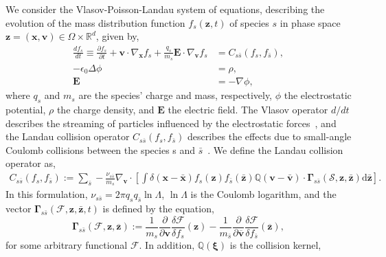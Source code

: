 \documentclass[preprint,12pt]{elsarticle}
\theoremstyle{definition}
\begin{document}
We consider the Vlasov-Poisson-Landau system of equations, describing the evolution of the mass distribution function $f_s (\boldsymbol{z},t)$ of species $s$ in phase space $\boldsymbol{z} = (\boldsymbol{x}, \boldsymbol{v}) \in \Omega \times \mathbb{R}^{d}$, given by,
\begin{align}
  \frac{d f_{s}}{d t} \equiv \frac{\partial f_{s}}{\partial t}+\boldsymbol{v} \cdot \nabla_{\boldsymbol{x}} f_{s}+\frac{q_s}{m_s} \boldsymbol{E} \cdot \nabla_{\boldsymbol{v}} f_{s} &= C_{s \bar{s}} (f_s, f_{\bar{s}}),\label{eq:VML}\\
  -\epsilon_0 \Delta \phi &= \rho,\label{eq:Poisson}\\
  \boldsymbol{E} &= -\nabla \phi\label{eq:electrostatic},
\end{align}
where $q_s$ and $m_s$ are the species' charge and mass, respectively, $\phi$ the electrostatic potential, $\rho$ the charge density, and $\boldsymbol{E}$ the electric field. The Vlasov operator $d/dt$  describes the streaming of particles influenced by the electrostatic forces~\cite{Vlasov1938}, and the Landau collision operator $C_{s \overline{s}}(f_s, f_{\bar{s}})$ describes the effects due to small-angle Coulomb collisions between the species s and $\bar{s}$~\cite{Landau1936}. We define the Landau collision operator as,
\begin{align}
C_{s \overline{s}}(f_s, f_{\bar{s}}):= \sum_{\bar{s}} -\frac{\nu_{s \bar{s}}}{m_s} \nabla_{\boldsymbol{v}} \cdot \left[ \int \delta (\boldsymbol{x} - \bar{\boldsymbol{x}}) f_s(\boldsymbol{z}) f_{\bar{s}}(\bar{\boldsymbol{z}}) \mathbb{Q}\left(\boldsymbol{v}-\bar{\boldsymbol{v}}\right) \cdot \boldsymbol{\Gamma}_{s \bar{s}} (\mathcal{S}, \boldsymbol{z},\bar{\boldsymbol{z}}) \mathrm{d} \boldsymbol{\bar{z}}\right].
\label{eq:ColOp}
\end{align}
In this formulation, $\nu_{s \bar{s}} = 2\pi q_s q_{\bar{s}} \ln \Lambda$, $\ln \Lambda$ is the Coulomb logarithm, and the vector $\boldsymbol{\Gamma}_{s \bar{s}} (\mathcal{F}, \boldsymbol{z},\bar{\boldsymbol{z}},t)$ is defined by the equation,
\begin{equation}
  \boldsymbol{\Gamma}_{s \bar{s}}(\mathcal{F}, \boldsymbol{z}, \overline{\boldsymbol{z}}):=\frac{1}{m_{s}} \frac{\partial}{\partial \boldsymbol{v}} \frac{\delta \mathcal{F}}{\delta f_{s}}(\boldsymbol{z})-\frac{1}{m_{\bar{s}}} \frac{\partial}{\partial \overline{\boldsymbol{v}}} \frac{\delta \mathcal{F}}{\delta f_{\bar{s}}}(\overline{\boldsymbol{z}}),
\end{equation}
for some arbitrary functional $\mathcal{F}$. In addition, $\mathbb{Q} (\boldsymbol{\xi})$ is the collision kernel, 
\end{document}
